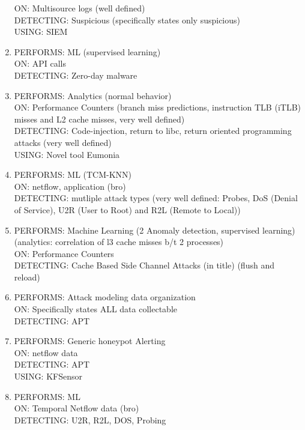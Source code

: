 \documentclass[conference]{IEEEtran}
\begin{document}
\begin{enumerate}
    ON: Multisource logs (well defined)\\ 
    DETECTING: Suspicious (specifically states only suspicious)\\ 
    USING: SIEM \cite{yen2013beehive}
    \item 
    PERFORMS: ML (supervised learning)  \\
    ON: API calls  \\
    DETECTING: Zero-day malware \\
    \cite{alazab2011zero}
    \item
    PERFORMS: Analytics (normal behavior) \\
    ON: Performance Counters (branch miss predictions, instruction TLB (iTLB) misses and L2 cache misses, very well defined) \\
    DETECTING: Code-injection, return to libc, return oriented programming attacks (very well defined)  \\
    USING: Novel tool Eumonia 
    \cite{yuan2011security}
    \item
    PERFORMS:  ML (TCM-KNN)\\
    ON: netflow, application (bro) \\
    DETECTING: mutliple attack types (very well defined: Probes, DoS (Denial of Service), U2R (User to Root) and
R2L (Remote to Local))
    \cite{li2007network}
    \item
    PERFORMS: Machine Learning (2 Anomaly detection, supervised learning) (analytics: correlation of l3 cache misses b/t 2 processes)  \\
    ON: Performance Counters  \\
    DETECTING: Cache Based Side Channel Attacks (in title) (flush and reload) 
    \cite{chiappetta2016real}
    \item
    PERFORMS: Attack modeling data organization \\
    ON: Specifically states ALL data collectable \\
    DETECTING: APT
    \cite{giura2012context}
    \item
    PERFORMS: Generic honeypot Alerting \\
    ON: netflow data \\
    DETECTING: APT \\
    USING: KFSensor
    \cite{saud2015towards}
    \item
    PERFORMS: ML  \\
    ON: Temporal Netflow data (bro)  \\
    DETECTING: U2R, R2L, DOS, Probing

\end{enumerate}
\end{document}
